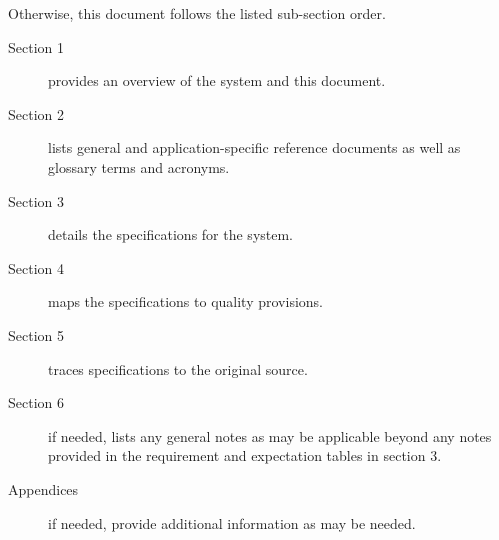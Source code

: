 Otherwise, this document follows the listed \SSS sub-section order.
\begin{description}
	\item[Section 1] provides an overview of the system and this document.
	\item[Section 2] lists general and application-specific reference documents as well as glossary terms and acronyms. 
	\item[Section 3] details the specifications for the system.
	\item[Section 4] maps the specifications to quality provisions. 
	\item[Section 5] traces specifications to the original source.
	\item[Section 6] if needed, lists any general notes as may be applicable beyond any notes provided in the requirement and expectation tables in section 3.
	\item[Appendices] if needed, provide additional information as may be needed.
\end{description}